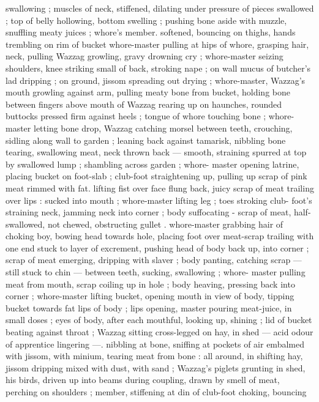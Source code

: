 swallowing ; muscles of neck, stiffened, dilating under pressure of
pieces swallowed ; top of belly hollowing, bottom swelling ; pushing
bone aside with muzzle, snuffling meaty juices ; whore’s member.
softened, bouncing on thighs, hands trembling on rim of bucket
whore-master pulling at hips of whore, grasping hair, neck, pulling
Wazzag growling, gravy drowning cry ; whore-master seizing
shoulders, knee striking small of back, stroking nape ; on wall
mucus of butcher's lad dripping ; on ground, jissom spreading out
drying ; whore-master, Wazzag's mouth growling against arm, pulling
meaty bone from bucket, holding bone between fingers above mouth
of Wazzag rearing up on haunches, rounded buttocks pressed firm
against heels ; tongue of whore touching bone ; whore-master letting
bone drop, Wazzag catching morsel between teeth, crouching, sidling
along wall to garden ; leaning back against tamarisk, nibbling bone
tearing, swallowing meat, neck thrown back --- smooth, straining
spurred at top by swallowed lump ; shambling across garden ; whore-
master opening latrine, placing bucket on foot-slab ; club-foot
straightening up, pulling up scrap of pink meat rimmed with fat.
lifting fist over face flung back, juicy scrap of meat trailing over lips
: sucked into mouth ; whore-master lifting leg ; toes stroking club-
foot's straining neck, jamming neck into corner ; body suffocating -
scrap of meat, half-swallowed, not chewed, obstructing gullet .
whore-master grabbing hair of choking boy, bowing head towards
hole, placing foot over meat-scrap trailing with one end stuck to layer
of excrement, pushing head of body back up, into corner ; scrap of
meat emerging, dripping with slaver ; body panting, catching scrap
--- still stuck to chin --- between teeth, sucking, swallowing ; whore-
master pulling meat from mouth, scrap coiling up in hole ; body
heaving, pressing back into corner ; whore-master lifting bucket,
opening mouth in view of body, tipping bucket towards fat lips of
body ; lips opening, master pouring meat-juice, in small doses ; eyes
of body, after each mouthful, looking up, shining ; lid of bucket
beating against throat ; Wazzag sitting cross-legged on hay, in shed
--- acid odour of apprentice lingering ---. nibbling at bone, sniffing
at pockets of air embalmed with jissom, with minium, tearing meat
from bone : all around, in shifting hay, jissom dripping mixed with
dust, with sand ; Wazzag's piglets grunting in shed, his birds, driven
up into beams during coupling, drawn by smell of meat, perching on
shoulders ; member, stiffening at din of club-foot choking, bouncing
